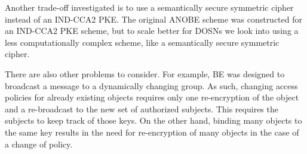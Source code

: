 Another trade-off investigated is to use a semantically secure symmetric cipher 
instead of an IND-CCA2 \ac{PKE}.
The original \ac{ANOBE} scheme was constructed for an IND-CCA2 \ac{PKE} scheme, 
but to scale better for \acp{DOSN} we look into using a less computationally 
complex scheme, like a semantically secure symmetric cipher.

There are also other problems to consider.
For example, \ac{BE} was designed to broadcast a message to a dynamically 
changing group.
As such, changing access policies for already existing objects requires only 
one re-encryption of the object and a re-broadcast to the new set of authorized 
subjects.
This requires the subjects to keep track of those keys.
On the other hand, binding many objects to the same key results in the need for 
re-encryption of many objects in the case of a change of policy.


\printbibliography
